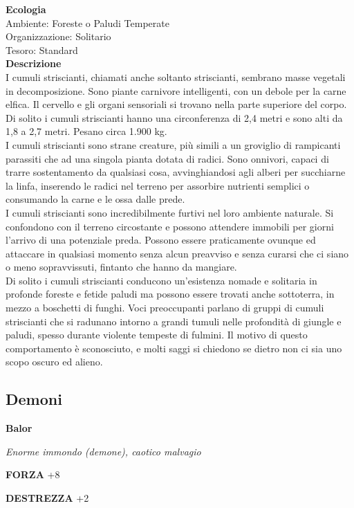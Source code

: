 \begin{multicols}{2}
\textbf{Ecologia}\\
Ambiente: Foreste o Paludi Temperate\\
Organizzazione: Solitario\\
Tesoro: Standard\\
\textbf{Descrizione}\\
I cumuli striscianti, chiamati anche soltanto striscianti, sembrano masse vegetali in decomposizione. Sono piante carnivore intelligenti, con un debole per la carne elfica. Il cervello e gli organi sensoriali si trovano nella parte superiore del corpo. Di solito i cumuli striscianti hanno una circonferenza di 2,4 metri e sono alti da 1,8 a 2,7 metri. Pesano circa 1.900 kg.\\
I cumuli striscianti sono strane creature, più simili a un groviglio di rampicanti parassiti che ad una singola pianta dotata di radici. Sono onnivori, capaci di trarre sostentamento da qualsiasi cosa, avvinghiandosi agli alberi per succhiarne la linfa, inserendo le radici nel terreno per assorbire nutrienti semplici o consumando la carne e le ossa dalle prede.\\
I cumuli striscianti sono incredibilmente furtivi nel loro ambiente naturale. Si confondono con il terreno circostante e possono attendere immobili per giorni l'arrivo di una potenziale preda. Possono essere praticamente ovunque ed attaccare in qualsiasi momento senza alcun preavviso e senza curarsi che ci siano o meno sopravvissuti, fintanto che hanno da mangiare.\\
Di solito i cumuli striscianti conducono un'esistenza nomade e solitaria in profonde foreste e fetide paludi ma possono essere trovati anche sottoterra, in mezzo a boschetti di funghi. Voci preoccupanti parlano di gruppi di cumuli striscianti che si radunano intorno a grandi tumuli nelle profondità di giungle e paludi, spesso durante violente tempeste di fulmini. Il motivo di questo comportamento è sconosciuto, e molti saggi si chiedono se dietro non ci sia uno scopo oscuro ed alieno.\\


\subsection{Demoni}

\medskip{}\textbf{Balor}

\emph{Enorme immondo (demone), caotico malvagio}

\textbf{FORZA} +8

\textbf{DESTREZZA} +2


\end{multicols}
